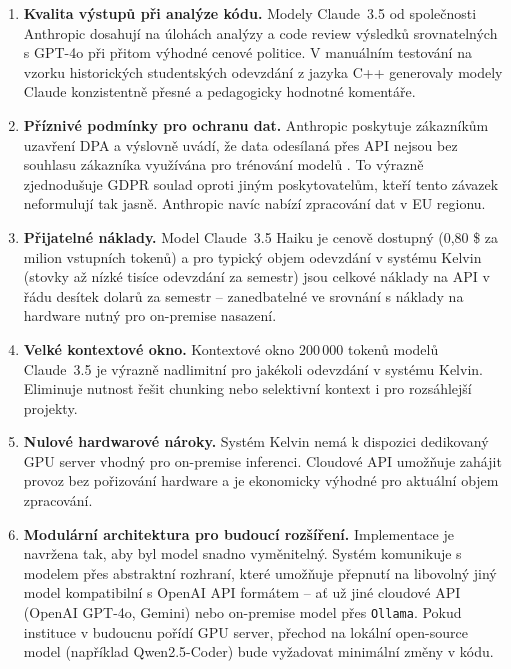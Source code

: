 \begin{enumerate}
    \item \textbf{Kvalita výstupů při analýze kódu.}
    Modely Claude~3.5 od společnosti Anthropic dosahují na úlohách analýzy a code review výsledků srovnatelných s GPT-4o při přitom výhodné cenové politice.
    V manuálním testování na vzorku historických studentských odevzdání z jazyka C++ generovaly modely Claude konzistentně přesné a pedagogicky hodnotné komentáře.

    \item \textbf{Příznivé podmínky pro ochranu dat.}
    Anthropic poskytuje zákazníkům uzavření DPA a výslovně uvádí, že data odesílaná přes API nejsou bez souhlasu zákazníka využívána pro trénování modelů \cite{anthropic_api}.
    To výrazně zjednodušuje GDPR soulad oproti jiným poskytovatelům, kteří tento závazek neformulují tak jasně.
    Anthropic navíc nabízí zpracování dat v EU regionu.

    \item \textbf{Přijatelné náklady.}
    Model Claude~3.5 Haiku je cenově dostupný (0,80 \$ za milion vstupních tokenů) a pro typický objem odevzdání v systému Kelvin (stovky až nízké tisíce odevzdání za semestr) jsou celkové náklady na API v řádu desítek dolarů za semestr -- zanedbatelné ve srovnání s náklady na hardware nutný pro on-premise nasazení.

    \item \textbf{Velké kontextové okno.}
    Kontextové okno 200\,000 tokenů modelů Claude~3.5 je výrazně nadlimitní pro jakékoli odevzdání v systému Kelvin.
    Eliminuje nutnost řešit chunking nebo selektivní kontext i pro rozsáhlejší projekty.

    \item \textbf{Nulové hardwarové nároky.}
    Systém Kelvin nemá k dispozici dedikovaný GPU server vhodný pro on-premise inferenci.
    Cloudové API umožňuje zahájit provoz bez pořizování hardware a je ekonomicky výhodné pro aktuální objem zpracování.

    \item \textbf{Modulární architektura pro budoucí rozšíření.}
    Implementace je navržena tak, aby byl model snadno vyměnitelný.
    Systém komunikuje s modelem přes abstraktní rozhraní, které umožňuje přepnutí na libovolný jiný model kompatibilní s OpenAI API formátem -- ať už jiné cloudové API (OpenAI GPT-4o, Gemini) nebo on-premise model přes \texttt{Ollama}.
    Pokud instituce v budoucnu pořídí GPU server, přechod na lokální open-source model (například Qwen2.5-Coder) bude vyžadovat minimální změny v kódu.
\end{enumerate}

